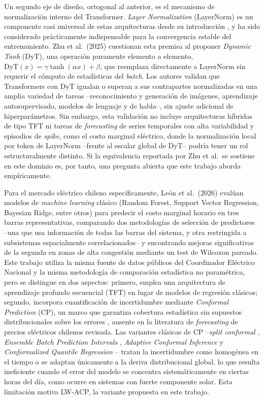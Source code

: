 \documentclass[applsci,article,submit,moreauthors,pdftex]{Definitions/mdpi}
\begin{document}
Un segundo eje de diseño, ortogonal al anterior, es el mecanismo de normalización interno del Transformer. \textit{Layer Normalization} (LayerNorm) es un componente casi universal de estas arquitecturas desde su introducción \cite{Vaswani2017Attention}, y ha sido considerado prácticamente indispensable para la convergencia estable del entrenamiento. Zhu et al.\ (2025) \cite{Zhu2025Transformers} cuestionan esta premisa al proponer \textit{Dynamic Tanh} (DyT), una operación puramente elemento a elemento, $\mathrm{DyT}(x)=\gamma\tanh(\alpha x)+\beta$, que reemplaza directamente a LayerNorm sin requerir el cómputo de estadísticas del \textit{batch}. Los autores validan que Transformers con DyT igualan o superan a sus contrapartes normalizadas en una amplia variedad de tareas --reconocimiento y generación de imágenes, aprendizaje autosupervisado, modelos de lenguaje y de habla--, sin ajuste adicional de hiperparámetros. Sin embargo, esta validación no incluye arquitecturas híbridas de tipo TFT ni tareas de \textit{forecasting} de series temporales con alta variabilidad y episodios de \textit{spike}, como el costo marginal eléctrico, donde la normalización local por token de LayerNorm --frente al escalar global de DyT-- podría tener un rol estructuralmente distinto. Si la equivalencia reportada por Zhu et al.\ se sostiene en este dominio es, por tanto, una pregunta abierta que este trabajo aborda empíricamente.

Para el mercado eléctrico chileno específicamente, León et al.\ (2026) \cite{LeonSMPChile} evalúan modelos de \textit{machine learning} clásico (Random Forest, Support Vector Regression, Bayesian Ridge, entre otros) para predecir el costo marginal horario en tres barras representativas, comparando dos metodologías de selección de predictores --una que usa información de todas las barras del sistema, y otra restringida a subsistemas espacialmente correlacionados-- y encontrando mejoras significativas de la segunda en zonas de alta congestión mediante un test de Wilcoxon pareado. Este trabajo utiliza la misma fuente de datos públicos del Coordinador Eléctrico Nacional y la misma metodología de comparación estadística no paramétrica, pero se distingue en dos aspectos: primero, emplea una arquitectura de aprendizaje profundo secuencial (TFT) en lugar de modelos de regresión clásicos; segundo, incorpora cuantificación de incertidumbre mediante \textit{Conformal Prediction} (CP), un marco que garantiza cobertura estadística sin supuestos distribucionales sobre los errores \cite{ConformalPrediction}, ausente en la literatura de \textit{forecasting} de precios eléctricos chilenos revisada. Las variantes clásicas de CP --\textit{split conformal} \cite{VovkCP,LeiCP}, \textit{Ensemble Batch Prediction Intervals} \cite{XuCP}, \textit{Adaptive Conformal Inference} \cite{GibbsCP} y \textit{Conformalized Quantile Regression} \cite{RomanoCQR}-- tratan la incertidumbre como homogénea en el tiempo o se adaptan únicamente a la deriva distribucional global, lo que resulta ineficiente cuando el error del modelo se concentra sistemáticamente en ciertas horas del día, como ocurre en sistemas con fuerte componente solar. Esta limitación motiva LW-ACP, la variante propuesta en este trabajo.
\end{document}
